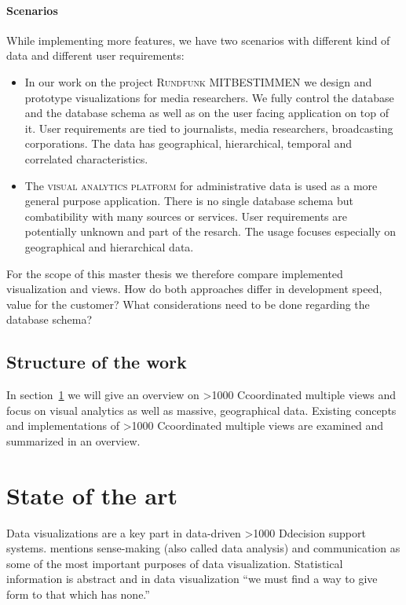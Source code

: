 \documentclass{article}
\newcommand{\rufu}{\textsc{Rundfunk MITBESTIMMEN}}
\newcommand{\visan}{\textsc{visual analytics platform}}
\newcommand\hmm[1]{\ifnum\ifhmode\spacefactor\else2000\fi>1000 \uppercase{#1}\else#1\fi}
\newcommand{\cmvs}{\hmm{c}oordinated multiple views}
\newcommand{\dss}{\hmm{d}ecision support systems}
\begin{document}
\paragraph{Scenarios}
While implementing more features, we have two scenarios with different kind of data and different user requirements:
\begin{itemize}
  \item
    In our work on the project \rufu{} we design and prototype visualizations for media researchers.
    We fully control the database and the database schema as well as on the user facing application on top of it.
    User requirements are tied to journalists, media researchers, broadcasting corporations.
    The data has geographical, hierarchical, temporal and correlated characteristics.
  \item
    The \visan{} for administrative data is used as a more general purpose application.
    There is no single database schema but combatibility with many sources or services.
    User requirements are potentially unknown and part of the resarch.
    The usage focuses especially on geographical and hierarchical data.
\end{itemize}

For the scope of this master thesis we therefore compare implemented visualization and views.
How do both approaches differ in development speed, value for the customer?
What considerations need to be done regarding the database schema?

\subsection{Structure of the work}

In section~\ref{sec:research} we will give an overview on \cmvs{} and focus on visual analytics as well as massive, geographical data.
Existing concepts and implementations of \cmvs{} are examined and summarized in an overview.

\newpage

\section{State of the art}\label{sec:research}
Data visualizations are a key part in data-driven \dss{}\cite{Nada2007}\cite{Poleto2015}.
\textcite{Few2013} mentions sense-making (also called data analysis) and communication as some of the most important purposes of data visualization.
Statistical information is abstract and in data visualization ``we must find a way to give form to that which has none.''\cite{Few2013}
\end{document}
